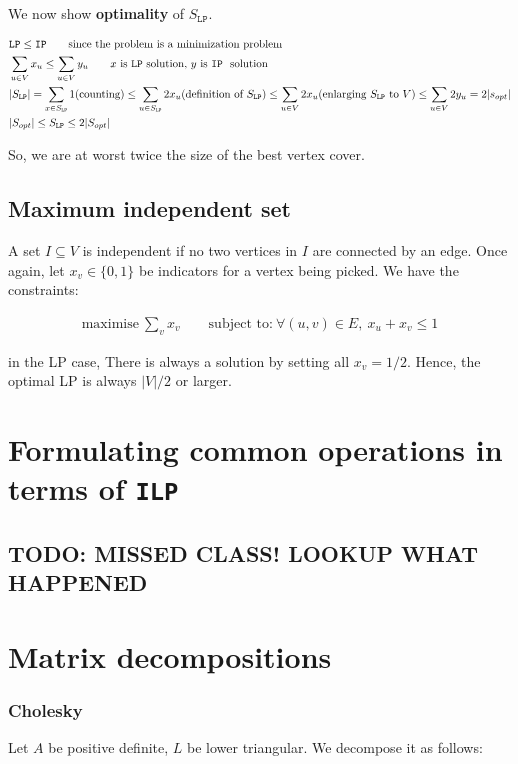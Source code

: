 \documentclass[11pt]{book}
\newcommand{\ilp}{\texttt{ILP} }
\newcommand{\ip}{\texttt{IP} }
\newcommand{\lp}{\texttt{LP}}
\begin{document}
We now show \textbf{optimality} of $S_\lp$.

\begin{align*}
    &\lp \leq \ip \qquad \text{since the problem is a minimization problem} \\
    &\sum_{u \in V} x_u \leq \sum_{u \in V} y_u \qquad \text{$x$ is \lp~solution, $y$ is \ip~solution} \\
    &|S_\lp| = \sum_{x \in S_\lp} 1 \text{(counting})\leq 
    \sum_{u\in S_\lp} 2 x_u  \text{(definition of $S_\lp$)} \leq
    \sum_{u \in V} 2 x_u \text{(enlarging $S_\lp$ to $V$)} \leq
        \sum_{u \in V} 2 y_u = 2|s_{opt}| \\
    &|S_{opt}| \leq S_\lp \leq 2 |S_{opt}|
\end{align*}

So, we are at worst twice the size of the best vertex cover.

\section{Maximum independent set}
A set $I \subseteq V$ is independent if no two vertices in $I$ are connected
by an edge. Once again, let $x_v \in \{0, 1\}$ be indicators for a vertex
being picked. We have the constraints:

\begin{align*}
    \text{maximise}~\sum_v x_v \qquad \text{subject to:}~\forall (u, v) \in E,~ x_u + x_v \leq 1
\end{align*}

in the LP case, There is always a solution by setting all $x_v = 1/2$. Hence,
the optimal LP is always $|V|/2$ or larger.

\chapter{Formulating common operations in terms of \ilp}

\section{TODO: MISSED CLASS! LOOKUP WHAT HAPPENED}

\chapter{Matrix decompositions}
\subsection{Cholesky}
Let $A$ be positive definite, $L$  be lower triangular. We decompose it as follows:
\end{document}
